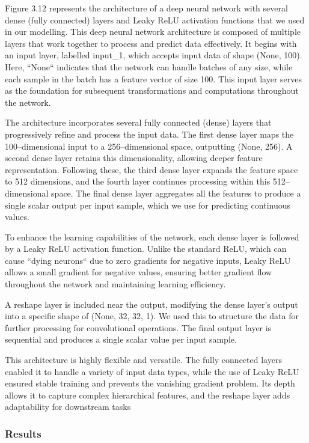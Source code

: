 \documentclass[12pt,a4paper]{report}
\numberwithin{equation}{section}
\begin{document}
Figure 3.12 represents the architecture of a deep neural network with
several dense (fully connected) layers and Leaky ReLU activation
functions that we used in our modelling. This deep neural network
architecture is composed of multiple layers that work together to
process and predict data effectively. It begins with an input layer,
labelled input\_1, which accepts input data of shape (None, 100). Here,
``None`` indicates that the network can handle batches of any size, while
each sample in the batch has a feature vector of size 100. This input
layer serves as the foundation for subsequent transformations and
computations throughout the network.

The architecture incorporates several fully connected (dense) layers
that progressively refine and process the input data. The first dense
layer maps the 100--dimensional input to a 256--dimensional space,
outputting (None, 256). A second dense layer retains this
dimensionality, allowing deeper feature representation. Following these,
the third dense layer expands the feature space to 512 dimensions, and
the fourth layer continues processing within this 512--dimensional space.
The final dense layer aggregates all the features to produce a single
scalar output per input sample, which we use for predicting continuous
values.

To enhance the learning capabilities of the network, each dense layer is
followed by a Leaky ReLU activation function. Unlike the standard ReLU,
which can cause ``dying neurons`` due to zero gradients for negative
inputs, Leaky ReLU allows a small gradient for negative values, ensuring
better gradient flow throughout the network and maintaining learning
efficiency.

A reshape layer is included near the output, modifying the dense layer's
output into a specific shape of (None, 32, 32, 1). We used this to
structure the data for further processing for convolutional operations.
The final output layer is sequential and produces a single scalar value
per input sample.

This architecture is highly flexible and versatile. The fully connected
layers enabled it to handle a variety of input data types, while the use
of Leaky ReLU ensured stable training and prevents the vanishing
gradient problem. Its depth allows it to capture complex hierarchical
features, and the reshape layer adds adaptability for downstream tasks

\hypertarget{results}{%
\subsubsection{Results}\label{results}}
\end{document}
